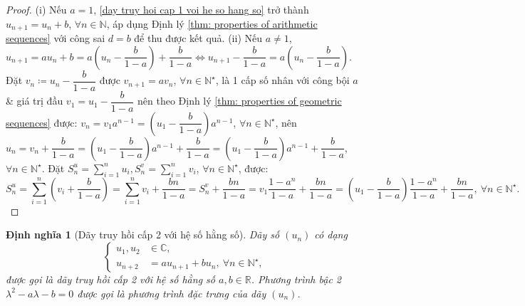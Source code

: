 \documentclass{article}
\newtheorem{dinhnghia}{Định nghĩa}
\begin{document}
\begin{proof}
	(i) Nếu $a = 1$, \eqref{day truy hoi cap 1 voi he so hang so} trở thành $u_{n+1} = u_n + b$, $\forall n\in\mathbb{N}$, áp dụng Định lý \ref{thm: properties of arithmetic sequences} với công sai $d = b$ để thu được kết quả. (ii) Nếu $a\ne1$, $u_{n+1} = au_n + b = a\left(u_n - \dfrac{b}{1 - a}\right) + \dfrac{b}{1 - a}\Leftrightarrow u_{n+1} - \dfrac{b}{1 - a} = a\left(u_n - \dfrac{b}{1 - a}\right)$. Đặt $v_n\coloneqq u_n - \dfrac{b}{1 - a}$ được $v_{n+1} = av_n$, $\forall n\in\mathbb{N}^\star$, là 1 cấp số nhân với công bội $a$ \& giá trị đầu $v_1 = u_1 - \dfrac{b}{1 - a}$ nên theo Định lý \ref{thm: properties of geometric sequences} được: $v_n = v_1a^{n-1} = \left(u_1 - \dfrac{b}{1 - a}\right)a^{n-1}$, $\forall n\in\mathbb{N}^\star$, nên $u_n = v_n + \dfrac{b}{1 - a} = \left(u_1 - \dfrac{b}{1 - a}\right)a^{n-1} + \dfrac{b}{1 - a} = \left(u_1 - \dfrac{b}{1 - a}\right)a^{n-1} + \dfrac{b}{1 - a}$, $\forall n\in\mathbb{N}^\star$. Đặt $S_n^u = \sum_{i=1}^n u_i,S_n^v = \sum_{i=1}^n v_i$, $\forall n\in\mathbb{N}^\star$, được:
	\begin{equation*}
		S_n^u = \sum_{i=1}^n \left(v_i + \dfrac{b}{1 - a}\right) = \sum_{i=1}^n v_i + \dfrac{bn}{1 - a} = S_n^v + \dfrac{bn}{1 - a} = v_1\dfrac{1 - a^n}{1 - a} + \dfrac{bn}{1 - a} = \left(u_1 - \dfrac{b}{1 - a}\right)\dfrac{1 - a^n}{1 - a} + \dfrac{bn}{1 - a},\ \forall n\in\mathbb{N}^\star.
	\end{equation*}
\end{proof}

\begin{dinhnghia}[Dãy truy hồi cấp 2 với hệ số hằng số]
	Dãy số $(u_n)$ có dạng
	\begin{equation}
		\label{day truy hoi cap 2 voi he so hang so}
		\left\{\begin{split}
			u_1,u_2&\in\mathbb{C},\\
			u_{n+2} &= au_{n+1} + bu_n,\ \forall n\in\mathbb{N}^\star,
		\end{split}\right.
	\end{equation}
	được gọi là {\rm dãy truy hồi cấp 2 với hệ số hằng số} $a,b\in\mathbb{R}$. Phương trình bậc 2 $\lambda^2 - a\lambda - b = 0$ được gọi là {\rm phương trình đặc trưng} của dãy $(u_n)$.
\end{dinhnghia}
\end{document}
